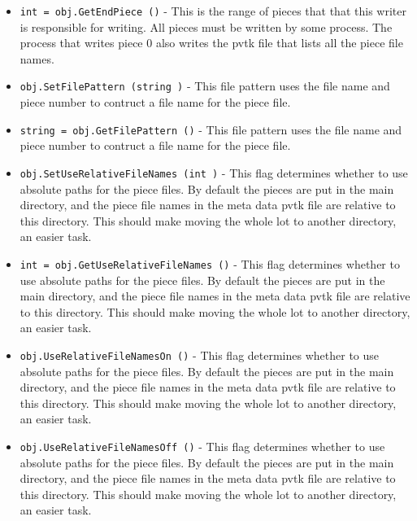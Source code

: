 \begin{itemize}
\item  \verb|int = obj.GetEndPiece ()| -  This is the range of pieces that that this writer is 
 responsible for writing.  All pieces must be written
 by some process.  The process that writes piece 0 also
 writes the pvtk file that lists all the piece file names.

\item  \verb|obj.SetFilePattern (string )| -  This file pattern uses the file name and piece number
 to contruct a file name for the piece file.

\item  \verb|string = obj.GetFilePattern ()| -  This file pattern uses the file name and piece number
 to contruct a file name for the piece file.

\item  \verb|obj.SetUseRelativeFileNames (int )| -  This flag determines whether to use absolute paths for the piece files.
 By default the pieces are put in the main directory, and the piece file
 names in the meta data pvtk file are relative to this directory.
 This should make moving the whole lot to another directory, an easier task.

\item  \verb|int = obj.GetUseRelativeFileNames ()| -  This flag determines whether to use absolute paths for the piece files.
 By default the pieces are put in the main directory, and the piece file
 names in the meta data pvtk file are relative to this directory.
 This should make moving the whole lot to another directory, an easier task.

\item  \verb|obj.UseRelativeFileNamesOn ()| -  This flag determines whether to use absolute paths for the piece files.
 By default the pieces are put in the main directory, and the piece file
 names in the meta data pvtk file are relative to this directory.
 This should make moving the whole lot to another directory, an easier task.

\item  \verb|obj.UseRelativeFileNamesOff ()| -  This flag determines whether to use absolute paths for the piece files.
 By default the pieces are put in the main directory, and the piece file
 names in the meta data pvtk file are relative to this directory.
 This should make moving the whole lot to another directory, an easier task.

\end{itemize}
